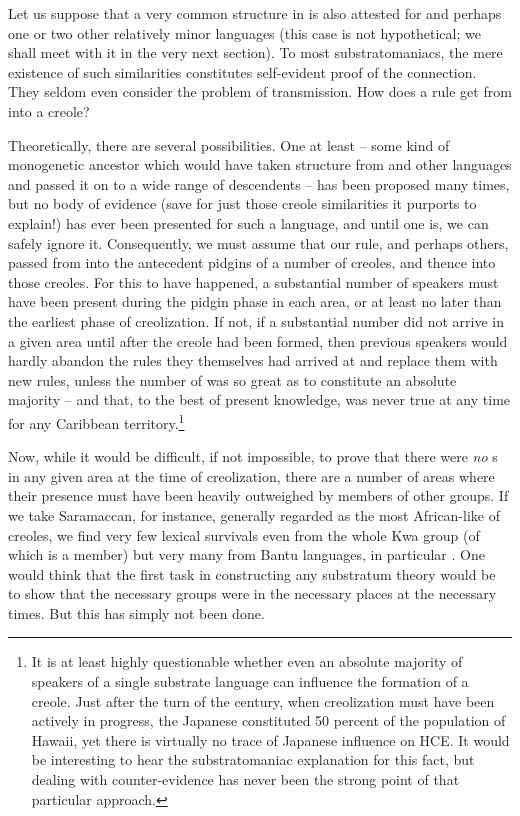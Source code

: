 Let us suppose that a very common structure in  is also attested for  and perhaps one or two other rela\-tively minor languages (this case is not hypothetical; we shall meet with it in the very next section). To most substratomaniacs, the mere existence of such similarities constitutes self-evident proof of the connection. They seldom even consider the problem of transmission. How does a rule get from  into a creole?

Theoretically, there are several possibilities. One at least -- some kind of monogenetic ancestor which would have taken structure from  and other languages and passed it on to a wide range of descen\-dents -- has been proposed many times, but no body of evidence (save for just those creole similarities it purports to explain!) has ever been presented for such a language, and until one is, we can safely ignore it. Consequently, we must assume that our rule, and perhaps others, passed from  into the antecedent pidgins of a number of creoles, and thence into those creoles. For this to have happened, a substantial number of  speakers must have been present during the pidgin
phase in each area, or at least no later than the earliest phase of creoli\-zation. If not, if a substantial number did not arrive in a given area until after the creole had been formed, then previous speakers would hardly abandon the rules they themselves had arrived at and replace them with new rules, unless the number of  was so great as to constitute an absolute majority -- and that, to the best of present knowledge, was never true at any time for any Caribbean territory.\footnote{It is at least highly questionable whether even an absolute majority of speakers of a single substrate language can influence the formation of a creole. Just after the turn of the century, when creolization must have been actively in progress, the Japanese constituted 50 percent of the population of Hawaii, yet there is virtually no trace of Japanese influence on HCE. It would be interesting to hear the substratomaniac explanation for this fact, but dealing with counter-evidence has never been the strong point of that particular approach.}%

Now, while it would be difficult, if not impossible, to prove that there were \textit{no} s in any given area at the time of creolization, there are a number of areas where their presence must have been heavily outweighed by members of other groups. If we take Sara\-maccan, for instance, generally regarded as the most African-like of creoles, we find very few lexical survivals even from the whole Kwa group (of which  is a member) but very many from Bantu lan\-guages, in particular  \citep{Daeleman1972}. One would think that the first task in constructing any substratum theory would be to show that the necessary groups were in the necessary places at the necessary times. But this has simply not been done.

